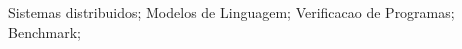 \acresetall

\noindent Sistemas distribuidos; Modelos de Linguagem; Verificacao de Programas; Benchmark;